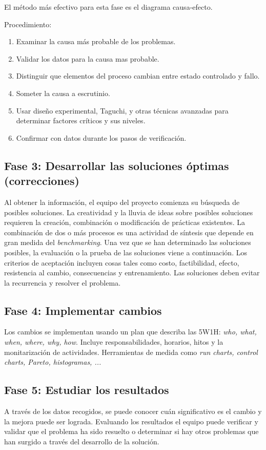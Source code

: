 \documentclass[]{article}
\begin{document}
El método más efectivo para esta fase es el diagrama causa-efecto.

Procedimiento:
\begin{enumerate}
	\item Examinar la causa más probable de los problemas.
	\item Validar los datos para la causa mas probable.
	\item Distinguir que elementos del proceso cambian entre estado controlado y fallo.
	\item Someter la causa a escrutinio.
	\item Usar diseño experimental, Taguchi, y otras técnicas avanzadas para determinar factores críticos y sus niveles.
	\item Confirmar con datos durante los pasos de verificación.
\end{enumerate}

\subsection{Fase 3: Desarrollar las soluciones óptimas (correcciones)}
Al obtener la información, el equipo del proyecto comienza su búsqueda de posibles soluciones. La creatividad y la lluvia de ideas sobre posibles soluciones requieren la creación, combinación o modificación de prácticas existentes. La combinación de dos o más procesos es una actividad de síntesis que depende en gran medida del \textit{benchmarking}.
Una vez que se han determinado las soluciones posibles, la evaluación o la prueba de las soluciones viene a continuación. Los criterios de aceptación incluyen cosas tales como costo, factibilidad, efecto, resistencia al cambio, consecuencias y entrenamiento. Las soluciones deben evitar la recurrencia y resolver el problema.

\subsection{Fase 4: Implementar cambios}
Los cambios se implementan usando un plan que describa las 5W1H: \textit{who, what, when, where, why, how}. Incluye responsabilidades, horarios, hitos y la monitarización de actividades. Herramientas de medida como \textit{run charts, control charts, Pareto, histogramas, ...}

\subsection{Fase 5: Estudiar los resultados}
A través de los datos recogidos, se puede conocer cuán significativo es el cambio y la mejora puede ser lograda. Evaluando los resultados el equipo puede verificar y validar que el problema ha sido resuelto o determinar si hay otros problemas que han surgido a través del desarrollo de la solución.
\end{document}
